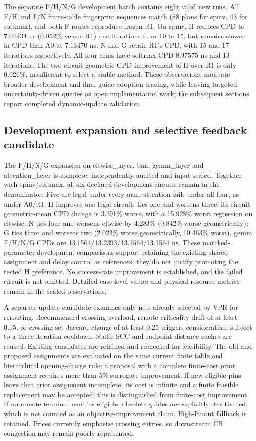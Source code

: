 \documentclass[conference,10pt]{IEEEtran}
\begin{document}
The separate F/H/N/G development batch contains eight valid new runs. All F/H and F/N finite-table fingerprint sequences match (88 plans for spmv, 43 for softmax), and both F routes reproduce frozen R1. On spmv, H reduces CPD to 7.04234 ns (0.052\% versus R1) and iterations from 19 to 15, but remains slower in CPD than A0 at 7.03470 ns. N and G retain R1's CPD, with 15 and 17 iterations respectively. All four arms have softmax CPD 8.97575 ns and 13 iterations. The two-circuit geometric CPD improvement of H over R1 is only 0.026\%, insufficient to select a stable method. These observations motivate broader development and final guide-adoption tracing, while leaving targeted uncertainty-driven queries as open implementation work; the subsequent sections report completed dynamic-update validation.



\subsection{Development expansion and selective feedback candidate}
The F/H/N/G expansion on eltwise\_layer, bnn, gemm\_layer and attention\_layer is complete, independently audited and input-sealed. Together with spmv/softmax, all six declared development circuits remain in the denominator. Five are legal under every arm; attention fails under all four, as under A0/R1. H improves one legal circuit, ties one and worsens three: its circuit-geometric-mean CPD change is 3.391\% worse, with a 15.928\% worst regression on eltwise. N ties four and worsens eltwise by 4.283\% (0.842\% worse geometrically); G ties three and worsens two (2.022\% worse geometrically, 10.463\% worst). gemm F/H/N/G CPDs are 13.1564/13.2393/13.1564/13.1564 ns. These matched-parameter development comparisons support retaining the existing shared assignment and delay control as references; they do not justify promoting the tested H preference. No success-rate improvement is established, and the failed circuit is not omitted. Detailed case-level values and physical-resource metrics remain in the sealed observations.

A separate update candidate examines only nets already selected by VPR for rerouting. Recommended crossing overload, remote criticality drift of at least 0.15, or crossing-set Jaccard change of at least 0.25 triggers consideration, subject to a three-iteration cooldown. Static SCC and endpoint distance caches are reused. Existing candidates are retained and rechecked for feasibility. The old and proposed assignments are evaluated on the same current finite table and hierarchical opening-charge rule; a proposal with a complete finite-cost prior assignment requires more than 5\% surrogate improvement. If new eligible pins leave that prior assignment incomplete, its cost is infinite and a finite feasible replacement may be accepted; this is distinguished from finite-cost improvement. If no remote terminal remains eligible, obsolete guides are explicitly deactivated, which is not counted as an objective-improvement claim. High-fanout fallback is retained. Prices currently emphasize crossing entries, so downstream CB congestion may remain poorly represented.
\end{document}
